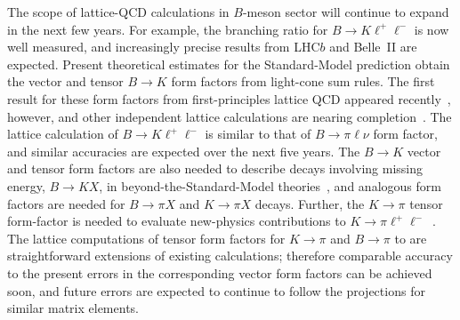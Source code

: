 \begin{itemize}
The scope of lattice-QCD calculations in $B$-meson sector will continue to
expand in the next few years.  For example, the branching ratio for $B\to
K\ell^+\ell^-$ is now well measured, and increasingly precise results from
LHC$b$ and Belle~II are expected.  Present theoretical estimates for the
Standard-Model prediction obtain the vector and tensor $B\to K$ form factors
from light-cone sum rules.  The first result for these form factors from
first-principles lattice QCD appeared recently~\cite{Bouchard:2013eph},
however, and other independent lattice calculations are nearing
completion~\cite{Zhou:2012dm}.  The lattice calculation of $B\to
K\ell^+\ell^-$ is similar to that of $B\to\pi\ell\nu$ form factor, and similar
accuracies are expected over the next five years.  The $B\to K$ vector and
tensor form factors are also needed to describe decays involving missing
energy, $B\to K X$, in beyond-the-Standard-Model
theories~\cite{Kamenik:2011vy}, and analogous form factors are needed for
$B\to\pi X$ and $K\to\pi X$ decays.  Further, the $K\to\pi$ tensor form-factor
is needed to evaluate new-physics contributions to
$K\to\pi\ell^+\ell^-$~\cite{Baum:2011rm}.  The lattice computations of tensor
form factors for $K\to\pi$ and $B\to\pi$ to are straightforward extensions of
existing calculations; therefore comparable accuracy to the present errors in
the corresponding vector form factors can be achieved soon, and future errors
are expected to continue to follow the projections for similar matrix
elements.


\end{itemize}
